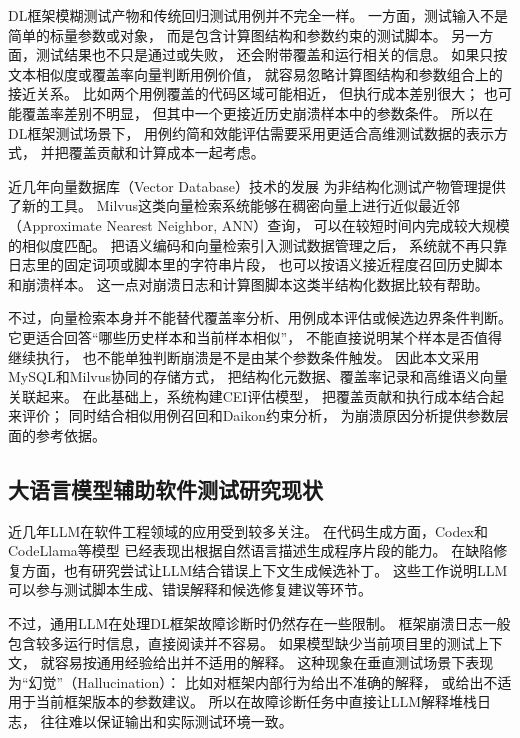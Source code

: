 DL框架模糊测试产物和传统回归测试用例并不完全一样。
一方面，测试输入不是简单的标量参数或对象，
而是包含计算图结构和参数约束的测试脚本。
另一方面，测试结果也不只是通过或失败，
还会附带覆盖和运行相关的信息。
如果只按文本相似度或覆盖率向量判断用例价值，
就容易忽略计算图结构和参数组合上的接近关系。
比如两个用例覆盖的代码区域可能相近，
但执行成本差别很大；
也可能覆盖率差别不明显，
但其中一个更接近历史崩溃样本中的参数条件。
所以在DL框架测试场景下，
用例约简和效能评估需要采用更适合高维测试数据的表示方式，
并把覆盖贡献和计算成本一起考虑。

近几年向量数据库（Vector Database）技术的发展
为非结构化测试产物管理提供了新的工具\cite{ref_milvus}。
Milvus这类向量检索系统能够在稠密向量上进行近似最近邻
（Approximate Nearest Neighbor, ANN）查询，
可以在较短时间内完成较大规模的相似度匹配。
把语义编码和向量检索引入测试数据管理之后，
系统就不再只靠日志里的固定词项或脚本里的字符串片段，
也可以按语义接近程度召回历史脚本和崩溃样本。
这一点对崩溃日志和计算图脚本这类半结构化数据比较有帮助。

不过，向量检索本身并不能替代覆盖率分析、用例成本评估或候选边界条件判断。
它更适合回答“哪些历史样本和当前样本相似”，
不能直接说明某个样本是否值得继续执行，
也不能单独判断崩溃是不是由某个参数条件触发。
因此本文采用MySQL和Milvus协同的存储方式，
把结构化元数据、覆盖率记录和高维语义向量关联起来。
在此基础上，系统构建CEI评估模型，
把覆盖贡献和执行成本结合起来评价；
同时结合相似用例召回和Daikon约束分析，
为崩溃原因分析提供参数层面的参考依据。

\subsection{大语言模型辅助软件测试研究现状}

近几年LLM在软件工程领域的应用受到较多关注\cite{ref_llm_se}。
在代码生成方面，Codex\cite{ref_codex}和CodeLlama\cite{ref_codellama}等模型
已经表现出根据自然语言描述生成程序片段的能力。
在缺陷修复方面，也有研究尝试让LLM结合错误上下文生成候选补丁\cite{ref_llm_repair}。
这些工作说明LLM可以参与测试脚本生成、错误解释和候选修复建议等环节。

不过，通用LLM在处理DL框架故障诊断时仍然存在一些限制。
框架崩溃日志一般包含较多运行时信息，直接阅读并不容易。
如果模型缺少当前项目里的测试上下文，
就容易按通用经验给出并不适用的解释。
这种现象在垂直测试场景下表现为“幻觉”（Hallucination）：
比如对框架内部行为给出不准确的解释，
或给出不适用于当前框架版本的参数建议\cite{ref_llm_hallucination}。
所以在故障诊断任务中直接让LLM解释堆栈日志，
往往难以保证输出和实际测试环境一致。

